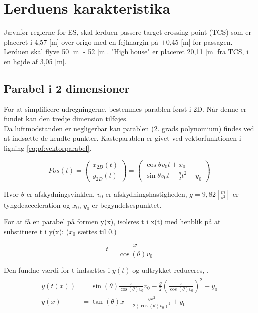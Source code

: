 \section{Lerduens karakteristika}
\label{sec:udregning_af_parabel}

Jævnfør reglerne for ES, skal lerduen passere target crossing point (TCS) som er 
placeret i 4,57 [m] over origo med en fejlmargin på \(\pm\)0,45 [m] for passagen. 
Lerduen skal flyve 50 [m] - 52 [m]. "High house" er placeret 20,11 [m] fra TCS, i en 
højde af 3,05 [m]. 

\subsection{Parabel i 2 dimensioner}
For at simplificere udregningerne, bestemmes parablen først i 2D. Når denne er fundet kan den tredje dimension tilføjes.\\

Da luftmodstanden er negligerbar kan parablen (2. grads polynomium) findes ved at indsætte de kendte punkter. Kasteparablen er givet ved vektorfunktionen i ligning \ref{eq:pf:vektorparabel}.

\begin{equation}
	Pos(t) = \left( \begin{array}{c}
	x_{2D}(t) \\
	y_{2D}(t)
	\end{array}
	\right)
	= \left( \begin{array}{c}
	\cos \theta v_0 t + x_0 \\
	\sin \theta v_0 t - \frac{g}{2} t^2 + y_0
	\end{array}
	\right)
\label{eq:pf:vektorparabel}
\end{equation}

Hvor \(\theta\) er afskydningsvinklen, \(v_0\) er afskydningshastigheden, \(g=9,82 \left[ \frac { m }{ { s }^{ 2 } } \right] \) er tyngdeacceleration og \(x_0\), \(y_0\) er begyndelsespunktet. 

For at få en parabel på formen y(x), isoleres t i x(t) med henblik på at substituere t i y(x): (\(x_0\) sættes til 0.)

\begin{equation}
t = \frac{x}{\cos \left( \theta \right) v_0}
\label{eq:pf:x(t)}
\end{equation}

Den fundne værdi for t indsættes i \(y(t)\) og udtrykket reduceres, \citep[Side. 67]{fund_of_physics}.
\begin{align}
\begin{split}
y(t(x)) &= \sin \left( \theta \right) \frac{x}{\cos \left( \theta \right) v_0} v_0 - \frac{g}{2} \left(\frac{x}{\cos \left( \theta \right) v_0}\right)^2 + y_0 \\
y(x) &= \tan \left( \theta \right) x - \frac{gx^2}{2(\cos \left( \theta \right) v_0)^2} + y_0
\label{eq:pf:y(x(t))}
\end{split}
\end{align}

